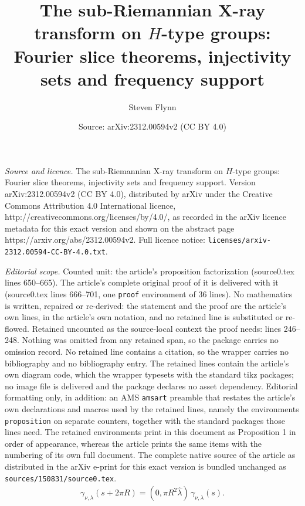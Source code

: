 \documentclass[10pt,a4paper]{amsart}
\title{The sub-Riemannian X-ray transform on $H$-type groups: Fourier slice theorems, injectivity sets and frequency support}
\author{Steven Flynn}
\date{Source: arXiv:2312.00594v2 (CC BY 4.0)}
\begin{document}
\maketitle

\noindent\emph{Source and licence.} The sub-Riemannian X-ray transform on $H$-type groups: Fourier slice theorems, injectivity sets and frequency support. Version arXiv:2312.00594v2 (CC BY 4.0), distributed by arXiv under the Creative Commons Attribution 4.0 International licence, http://creativecommons.org/licenses/by/4.0/, as recorded in the arXiv licence metadata for this exact version and shown on the abstract page https://arxiv.org/abs/2312.00594v2. Full licence notice: \texttt{licenses/arxiv-2312.00594-CC-BY-4.0.txt}.\par\smallskip

\noindent\textit{Editorial scope.} Counted unit: the article's proposition factorization (source0.tex lines 650--665). The article's complete original proof of it is delivered with it (source0.tex lines 666--701, one \texttt{proof} environment of 36 lines). No mathematics is written, repaired or re-derived: the statement and the proof are the article's own lines, in the article's own notation, and no retained line is substituted or re-flowed.  Retained uncounted as the source-local context the proof needs: lines 246--248.  Nothing was omitted from any retained span, so the package carries no omission record.  No retained line contains a citation, so the wrapper carries no bibliography and no bibliography entry.  The retained lines contain the article's own diagram code, which the wrapper typesets with the standard tikz packages; no image file is delivered and the package declares no asset dependency.  Editorial formatting only, in addition: an AMS \texttt{amsart} preamble that restates the article's own declarations and macros used by the retained lines, namely the environments \texttt{proposition} on separate counters, together with the standard packages those lines need.  The retained environments print in this document as Proposition 1 in order of appearance, whereas the article prints the same items with the numbering of its own full document.  The complete native source of the article as distributed in the arXiv e-print for this exact version is bundled unchanged as \texttt{sources/150831/source0.tex}.
\begin{align}\label{e:helicalSym}
	\gamma_{\nu, \lambda}(s+2\pi R)=(0, \pi R^2\hat\lambda)\,\gamma_{\nu, \lambda}(s).
\end{align}
\end{document}
